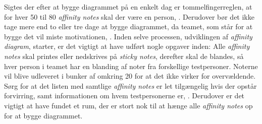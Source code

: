 Sigtes der efter at bygge diagrammet på en enkelt dag er tommelfingerreglen, at for hver 50 til 80 \textit{affinity notes} skal der være en person, \parencite[s. 163]{Book:BuildingAnAffinity}. Derudover bør det ikke tage mere end to eller tre dage at bygge diagrammet, da teamet, som står for at bygge det vil miste motivationen, \parencite[s. 163]{Book:BuildingAnAffinity}.\blankline
%
Inden selve processen, udviklingen af \textit{affinity diagram}, starter, er det vigtigt at have udført nogle opgaver inden: Alle \textit{affinity notes} skal printes eller nedskrives på \textit{sticky notes}, derefter skal de blandes, så hver person i teamet har en blanding af noter fra forskellige testpersoner. Noterne vil blive udleveret i bunker af omkring 20 for at det ikke virker for overvældende. Sørg for at det listen med samtlige \textit{affinity notes} er let tilgængelig hvis der opstår forvirring, samt informationen om hvem testpersonerne er, \parencite[ss. 163-164]{Book:BuildingAnAffinity}. Derudover er det vigtigt at have fundet et rum, der er stort nok til at hænge alle \textit{affinity notes} op for at bygge diagrammet. 

